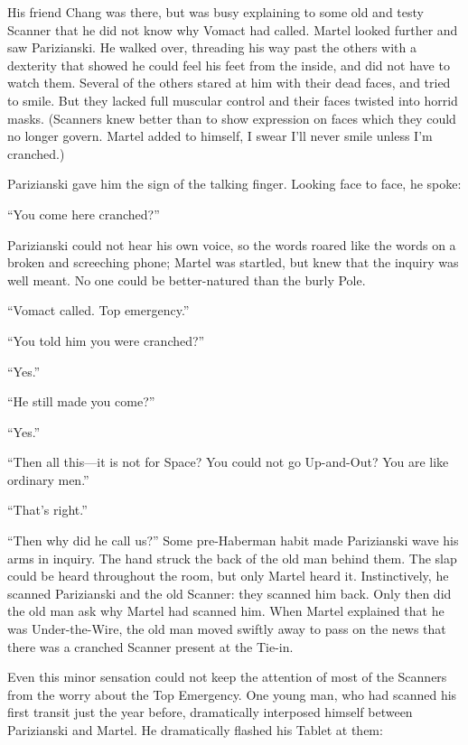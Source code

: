 His friend Chang was there, but was busy explaining to some old and testy Scanner that he did not know why Vomact had called. Martel looked further and saw Parizianski. He walked over, threading his way past the others with a dexterity that showed he could feel his feet from the inside, and did not have to watch them. Several of the others stared at him with their dead faces, and tried to smile. But they lacked full muscular control and their faces twisted into horrid masks. (Scanners knew better than to show expression on faces which they could no longer govern. Martel added to himself, I swear I'll never smile unless I'm cranched.)

Parizianski gave him the sign of the talking finger. Looking face to face, he spoke:

``You come here cranched?''

Parizianski could not hear his own voice, so the words roared like the words on a broken and screeching phone; Martel was startled, but knew that the inquiry was well meant. No one could be better-natured than the burly Pole.

``Vomact called. Top emergency.''

``You told him you were cranched?''

``Yes.''

``He still made you come?''

``Yes.''

``Then all this---it is not for Space? You could not go Up-and-Out? You are like ordinary men.''

``That's right.''

``Then why did he call us?'' Some pre-Haberman habit made Parizianski wave his arms in inquiry. The hand struck the back of the old man behind them. The slap could be heard throughout the room, but only Martel heard it. Instinctively, he scanned Parizianski and the old Scanner: they scanned him back. Only then did the old man ask why Martel had scanned him. When Martel explained that he was Under-the-Wire, the old man moved swiftly away to pass on the news that there was a cranched Scanner present at the Tie-in.

Even this minor sensation could not keep the attention of most of the Scanners from the worry about the Top Emergency. One young man, who had scanned his first transit just the year before, dramatically interposed himself between Parizianski and Martel. He dramatically flashed his Tablet at them:


